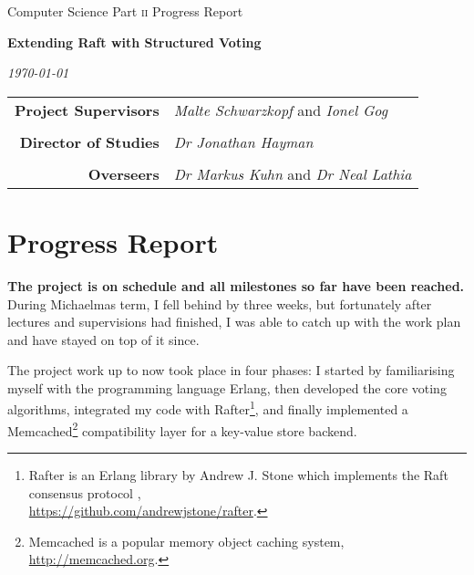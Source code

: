 \documentclass[10pt]{scrartcl}
\begin{document}
\thispagestyle{empty}

\changefontsizes{11pt}

 \medskip
{} \medskip
{}

\vfil

\centerline{\large Computer Science Part \textsc{ii} Progress Report} \vspace{0.4in}
\centerline{\Large\bf Extending Raft with Structured Voting} \vspace{0.3in}
\centerline{\large\it \today}

\vfil

\begin{center}
\begin{tabularx}{316pt}{rX}
\textbf{Project Supervisors} & \textit{Malte Schwarzkopf} and \textit{Ionel Gog} \\ \\
\textbf{Director of Studies} & \textit{Dr Jonathan Hayman} \\ \\
\textbf{Overseers} & \textit{Dr Markus Kuhn} and \textit{Dr Neal Lathia}
\end{tabularx}
\end{center}

\newpage

\changefontsizes{10pt}

\section{Progress Report%
  \label{progress-report}%
}

\textbf{The project is on schedule and all milestones so far have been reached.} During Michaelmas term, I fell behind by three weeks, but fortunately after lectures and supervisions had finished, I was able to catch up with the work plan and have stayed on top of it since.

The project work up to now took place in four phases: I started by familiarising myself with the programming language Erlang, then developed the core voting algorithms, integrated my code with Rafter\footnote{Rafter is an Erlang library by Andrew J. Stone which implements the Raft consensus protocol \cite{raft},\\\url{https://github.com/andrewjstone/rafter}.}, and finally implemented a Memcached\footnote{Memcached is a popular memory object caching system, \url{http://memcached.org}.} compatibility layer for a key-value store backend.
\end{document}
